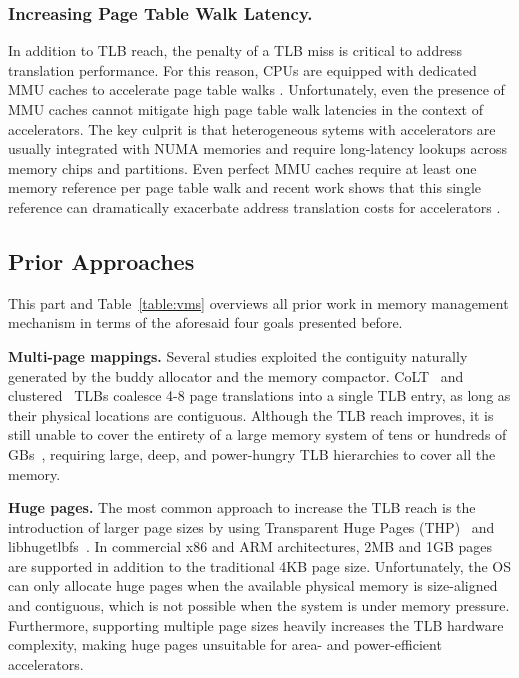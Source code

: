 \subsubsection{Increasing Page Table Walk Latency.} 
In addition to TLB reach, the penalty of a TLB miss is critical to
address translation performance. For this reason, CPUs are equipped
with dedicated MMU caches to accelerate page table walks
\cite{bhattacharjee:large-reach, barr:translation}. Unfortunately,
even the presence of MMU caches cannot mitigate high page table walk
latencies in the context of accelerators. The key culprit is that
heterogeneous sytems with accelerators are usually integrated with
NUMA memories and require long-latency lookups across memory chips and
partitions. Even perfect MMU caches require at least one memory
reference per page table walk and recent work shows that this single
reference can dramatically exacerbate address translation costs for
accelerators \cite{picorel:near-memory}.


\subsection{Prior Approaches}

This part and Table~\ref{table:vms} overviews all prior work in memory management mechanism in terms of the aforesaid four goals presented before.

\noindent\textbf{Multi-page mappings.} Several studies exploited
the contiguity naturally generated by the buddy allocator and the
memory compactor. CoLT~\cite{pham:colt} and clustered~\cite{pham:increasing} TLBs coalesce 4-8 page translations into a single TLB entry, as long as their physical locations are contiguous. Although the TLB reach improves, it is still unable to cover the entirety of a large memory system of tens or hundreds of GBs~\cite{gandhi:range}, requiring large, deep, and power-hungry TLB hierarchies to cover all the memory.

\noindent\textbf{Huge pages.} The most common approach to increase the TLB reach is the introduction of larger page sizes by using Transparent Huge Pages (THP)~\cite{transparenthugepages} and libhugetlbfs~\cite{lighugetlbfs}. In commercial x86 and ARM architectures, 2MB and 1GB pages are supported in addition to the traditional 4KB page size. Unfortunately, the OS can only allocate huge pages when the available physical memory is size-aligned and contiguous, which is not possible when the system is under memory pressure. Furthermore, supporting multiple page sizes heavily increases the TLB hardware complexity, making huge pages unsuitable for area- and power-efficient accelerators.


